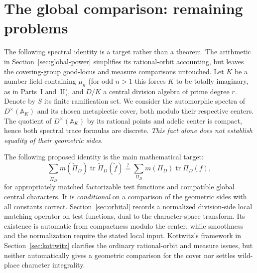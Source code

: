 \documentclass[11pt]{article}
\newcommand{\A}{\mathbb A}
\theoremstyle{plain}
\theoremstyle{definition}
\begin{document}
\section{The global comparison: remaining problems}\label{sec:global}
The following spectral identity is a target rather than a theorem.
The arithmetic in Section~\ref{sec:global-power} simplifies its
rational-orbit accounting, but leaves the covering-group good-locus
and measure comparisons untouched.
Let $K$ be a number field containing $\mu_n$ (for odd $n>1$ this forces $K$ to be totally imaginary, as in Parts~I and~II), and $D/K$ a central division algebra of prime degree $r$. Denote by $S$ its finite ramification set. We consider the automorphic spectra of $D^\times(\A_K)$ and its chosen metaplectic cover, both modulo their respective centers. The quotient of $D^\times(\A_K)$ by its rational points and adelic center is compact, hence both spectral trace formulas are discrete. \emph{This fact alone does not establish equality of their geometric sides.}

The following proposed identity is the main mathematical target:
\begin{equation}\label{eq:global-conj}
\sum_{\widetilde\Pi_D}m(\widetilde\Pi_D)
\operatorname{tr}\widetilde\Pi_D(\widetilde f)
\stackrel{?}{=}
\sum_{\Pi_D}m(\Pi_D)\operatorname{tr}\Pi_D(f),
\end{equation}
for appropriately matched factorizable test functions and compatible global central characters. It is \emph{conditional} on a comparison of the geometric sides with all constants correct. Section~\ref{sec:orbital} records a normalized division-side local
matching operator on test functions, dual to the character-space
transform. Its existence is automatic from compactness modulo the
center, while smoothness and the normalization require the stated
local input. Kottwitz's framework in Section~\ref{sec:kottwitz}
clarifies the ordinary rational-orbit and measure issues, but neither
automatically gives a geometric comparison for the cover nor
settles wild-place character integrality.
\end{document}
